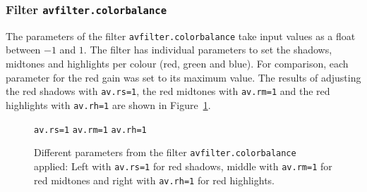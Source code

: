 \documentclass[../MasterThesis.tex]{subfiles}
\begin{document}
\subsubsection*{Filter \texttt{avfilter.colorbalance}}

The parameters of the filter \texttt{avfilter.colorbalance} take input values as a float between $-1$ and $1$. The filter has individual parameters to set the shadows, midtones and highlights per colour (red, green and blue). %
For comparison, each parameter for the red gain was set to its maximum value. The results of adjusting the red shadows with \texttt{av.rs=1}, the red midtones with \texttt{av.rm=1} and the red highlights with \texttt{av.rh=1} are shown in Figure~\ref{figure:rs1rm1rh1}.

\begin{figure}[H]
	\begin{center}
		\small{
		\texttt{av.rs=1} \hspace*{0.22\textwidth} \texttt{av.rm=1} \hspace*{0.23\textwidth} \texttt{av.rh=1}}
		\caption[Different parameters from the filter \texttt{avfilter.colorbalance} applied.]{Different parameters from the filter \texttt{avfilter.colorbalance} applied: Left with \texttt{av.rs=1} for red shadows, middle with \texttt{av.rm=1} for red midtones and right with \texttt{av.rh=1} for red highlights.}
			\label{figure:rs1rm1rh1}
	\end{center}
\end{figure}
\end{document}

